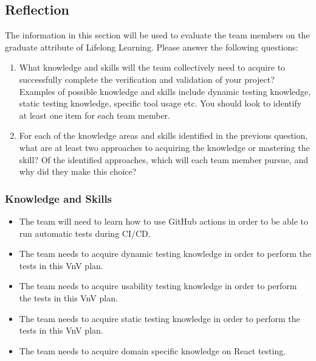 \documentclass[12pt, titlepage]{article}
\begin{document}



\newpage{}
\subsection{Reflection}


The information in this section will be used to evaluate the team members on the
graduate attribute of Lifelong Learning.  Please answer the following questions:

\begin{enumerate}
  \item What knowledge and skills will the team collectively need to acquire to
  successfully complete the verification and validation of your project?
  Examples of possible knowledge and skills include dynamic testing knowledge,
  static testing knowledge, specific tool usage etc.  You should look to
  identify at least one item for each team member.
  \item For each of the knowledge areas and skills identified in the previous
  question, what are at least two approaches to acquiring the knowledge or
  mastering the skill?  Of the identified approaches, which will each team
  member pursue, and why did they make this choice?
\end{enumerate}

\subsubsection{Knowledge and Skills}
\begin{itemize}
    \item The team will need to learn how to use GitHub actions in order to be able to run automatic tests during CI/CD.
    \item The team needs to acquire dynamic testing knowledge in order to perform the tests in this VnV plan.
    \item The team needs to acquire usability testing knowledge in order to perform the tests in this VnV plan.
    \item The team needs to acquire static testing knowledge in order to perform the tests in this VnV plan.
    \item The team needs to acquire domain specific knowledge on React testing.
\end{itemize}
\end{document}
